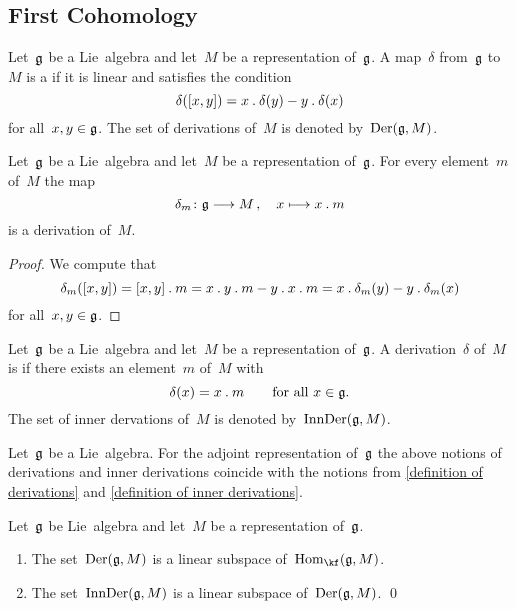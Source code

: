 \subsection{First Cohomology}

\begin{definition}
  Let~$\mathfrak{g}$ be a Lie~algebra and let~$M$ be a representation of~$\mathfrak{g}$.
  A map~$\delta$ from~$\mathfrak{g}$ to~$M$ is a  if it is linear and satisfies the condition
  \[
    \delta( [x,y] )
    =
    x \mathbin{.} \delta(y) - y \mathbin{.} \delta(x)
  \]
  for all~$x, y \in \mathfrak{g}$.
  The set of derivations of~$M$ is denoted by~$\operatorname{Der}(\mathfrak{g}, M)$.
\end{definition}


\begin{proposition}
  \label{inner derivations of representations}
  Let~$\mathfrak{g}$ be a Lie~algebra and let~$M$ be a representation of~$\mathfrak{g}$.
  For every element~$m$ of~$M$ the map
  \[
    \delta_m
    \colon
    \glie
    \to
    M \,,
    \quad
    x
    \mapsto
    x \act m
  \]
  is a derivation of~$M$.
\end{proposition}


\begin{proof}
  We compute that
  \[
    \delta_m([x,y])
    =
    [x,y] \mathbin{.} m
    =
    x \mathbin{.} y \mathbin{.} m - y \mathbin{.} x \mathbin{.} m
    =
    x \mathbin{.} \delta_m(y) - y \mathbin{.} \delta_m(x)
  \]
  for all~$x, y \in \mathfrak{g}$.
\end{proof}


\begin{definition}
  Let~$\mathfrak{g}$ be a Lie~algebra and let~$M$ be a representation of~$\mathfrak{g}$.
  A derivation~$\delta$ of~$M$ is  if there exists an element~$m$ of~$M$ with
  \[
    \delta(x) = x \mathbin{.} m
    \qquad
    \text{for all~$x \in \mathfrak{g}$.}
  \]
  The set of inner dervations of~$M$ is denoted by~$\operatorname{InnDer}(\mathfrak{g}, M)$.
\end{definition}


\begin{remark}
  Let~$\mathfrak{g}$ be a Lie~algebra.
  For the adjoint representation of~$\mathfrak{g}$ the above notions of derivations and inner derivations coincide with the notions from \cref{definition of derivations} and \cref{definition of inner derivations}.
\end{remark}


\begin{proposition}
  Let~$\mathfrak{g}$ be Lie~algebra and let~$M$ be a representation of~$\mathfrak{g}$.
  \begin{enumerate}
    \item
      The set~$\operatorname{Der}(\mathfrak{g}, M)$ is a linear subspace of~$\Hom_{\kf}(\glie, M)$.
    \item
      The set~$\operatorname{InnDer}(\mathfrak{g}, M)$ is a linear subspace of~$\operatorname{Der}(\mathfrak{g}, M)$.
    \qed
  \end{enumerate}
\end{proposition}


